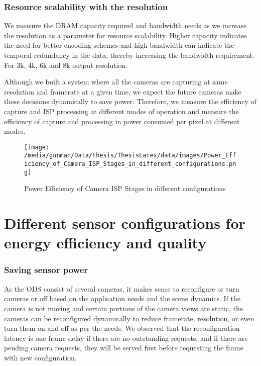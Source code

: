 \subsubsection{Resource scalability with the resolution}
We measure the DRAM capacity required and bandwidth needs as we increase the resolution as a parameter for resource scalability. Higher capacity indicates the need for better encoding schemes and high bandwidth can indicate the temporal redundancy in the data, thereby increasing the bandwidth requirement. For 3k, 4k, 6k and 8k output resolution.

Although we built a system where all the cameras are capturing at same resolution and framerate at a given time, we expect the future cameras make these decisions dynamically to save power. Therefore, we  measure the efficiency of capture and ISP processing at different modes of operation and measure the efficiency of capture and processing in power consumed per pixel at different modes.

\begin{figure*}
	\begin{center}
		\texttt{[image: /media/gunman/Data/thesis/ThesisLatex/data/images/Power\_Efficiency\_of\_Camera\_ISP\_Stages\_in\_different\_configurations.png]}
		\caption{Power Efficiency of Camera ISP Stages in different configurations}
		\label{fig:ex_4_9}
	\end{center}
	\vspace{-0.3in}
\end{figure*} 



\section{Different sensor configurations for energy efficiency and quality}
\subsubsection{Saving sensor power}
As the ODS consist of several cameras, it makes sense to reconfigure or turn cameras or off based on the application needs and the scene dynamics. If the camera is not moving and certain portions of the camera views are static, the cameras can be reconfigured dynamically to reduce framerate, resolution, or even turn them on and off as per the needs. We observed that the reconfiguration latency is one frame delay if there are no outstanding requests, and if there are pending camera requests, they will be served first before requesting the frame with new configuration. 
